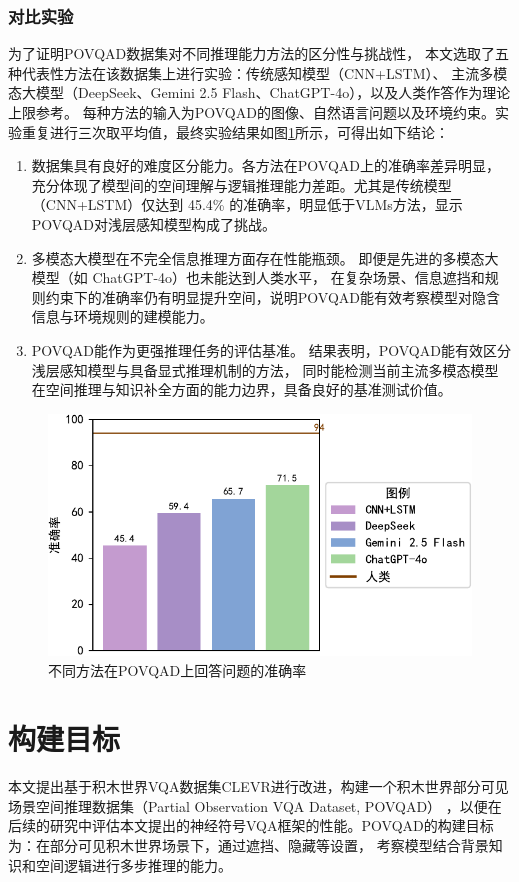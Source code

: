 \subsubsection{对比实验}
为了证明POVQAD数据集对不同推理能力方法的区分性与挑战性，
本文选取了五种代表性方法在该数据集上进行实验：传统感知模型（CNN+LSTM）、
主流多模态大模型（DeepSeek、Gemini 2.5 Flash、ChatGPT-4o），以及人类作答作为理论上限参考。
每种方法的输入为POVQAD的图像、自然语言问题以及环境约束。实验重复进行三次取平均值，最终实验结果如图\ref{fig:dataset-comparison}所示，可得出如下结论：
\begin{enumerate}[nosep]
\item 数据集具有良好的难度区分能力。各方法在POVQAD上的准确率差异明显，充分体现了模型间的空间理解与逻辑推理能力差距。尤其是传统模型（CNN+LSTM）仅达到 45.4\% 的准确率，明显低于VLMs方法，显示POVQAD对浅层感知模型构成了挑战。
\item 多模态大模型在不完全信息推理方面存在性能瓶颈。
即便是先进的多模态大模型（如 ChatGPT-4o）也未能达到人类水平，
在复杂场景、信息遮挡和规则约束下的准确率仍有明显提升空间，说明POVQAD能有效考察模型对隐含信息与环境规则的建模能力。
\item POVQAD能作为更强推理任务的评估基准。
结果表明，POVQAD能有效区分浅层感知模型与具备显式推理机制的方法，
同时能检测当前主流多模态模型在空间推理与知识补全方面的能力边界，具备良好的基准测试价值。
\end{enumerate}
\begin{figure}[h]
\centering
\includegraphics[scale=0.8]{figures/dataset-experiment-crop.pdf}
\caption{不同方法在POVQAD上回答问题的准确率}
\label{fig:dataset-comparison}
\end{figure}


\section{构建目标}
本文提出基于积木世界VQA数据集CLEVR进行改进，构建一个积木世界部分可见场景空间推理数据集（Partial Observation VQA Data\-set, POVQAD）
，以便在后续的研究中评估本文提出的神经符号VQA框架的性能。POVQAD的构建目标为：在部分可见积木世界场景下，通过遮挡、隐藏等设置，
考察模型结合背景知识和空间逻辑进行多步推理的能力。

